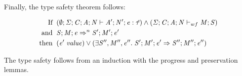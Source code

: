 \begin{nproof}
\end{nproof}


Finally, the type safety theorem follows:
\begin{theorem}
  \label{theorem:type-safety}
\begin{displaymath}
  \begin{aligned}
  \text{If} \;\; & (\emptyset;\mathit{\Sigma};\mathit{C};\mathit{A};\mathit{N} \vdash \mathit{A}';\mathit{N}';\mathit{e} : \mathit{\hat{\tau}}) \wedge
                   (\mathit{\Sigma};\mathit{C};\mathit{A};\mathit{N} \vdash_{wf} \mathit{M};\mathit{S}) \\
  \text{and} \;\; & \mathit{S};\mathit{M};\mathit{e} \Rightarrow^n \mathit{S}';\mathit{M}';\mathit{e}' \\
  \text{then} \;\; & (\mathit{e}' \; \mathit{value}) \vee
                     (\exists \mathit{S}'', \mathit{M}'', \mathit{e}'' . \; \mathit{S}';\mathit{M}';\mathit{e}' \Rightarrow \mathit{S}'';\mathit{M}'';\mathit{e}'')
  \end{aligned}
  \end{displaymath}
\end{theorem}

\begin{nproof}
  The type safety follows from an induction with
  the progress and preservation lemmas.
\end{nproof}



